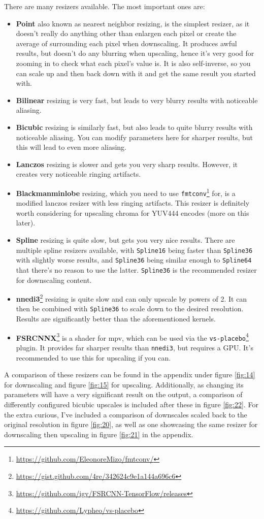 \documentclass{scrartcl}
\begin{document}
There are many resizers available.  The most important ones are:
\begin{itemize}
\item \textbf{Point} also known as nearest neighbor resizing, is the simplest resizer, as it doesn't really do anything other than enlargen each pixel or create the average of surrounding each pixel when downscaling.  It produces awful results, but doesn't do any blurring when upscaling, hence it's very good for zooming in to check what each pixel's value is.  It is also self-inverse, so you can scale up and then back down with it and get the same result you started with.
\item \textbf{Bilinear} resizing is very fast, but leads to very blurry results with noticeable aliasing.
\item \textbf{Bicubic} resizing is similarly fast, but also leads to quite blurry results with noticeable aliasing.  You can modify parameters here for sharper results, but this will lead to even more aliasing.
\item \textbf{Lanczos} resizing is slower and gets you very sharp results.  However, it creates very noticeable ringing artifacts.
\item \textbf{Blackmanminlobe} resizing, which you need to use \texttt{fmtconv}\footnote{\url{https://github.com/EleonoreMizo/fmtconv/}} for, is a modified lanczos resizer with less ringing artifacts.   This resizer is definitely worth considering for upscaling chroma for YUV444 encodes (more on this later).
\item \textbf{Spline} resizing is quite slow, but gets you very nice results.  There are multiple spline resizers available, with \texttt{Spline16} being faster than \texttt{Spline36} with slightly worse results, and \texttt{Spline36} being similar enough to \texttt{Spline64} that there's no reason to use the latter.  \texttt{Spline36} is the recommended resizer for downscaling content.
\item \textbf{nnedi3}\footnote{\url{https://gist.github.com/4re/342624c9e1a144a696c6}} resizing is quite slow and can only upscale by powers of 2.  It can then be combined with \texttt{Spline36} to scale down to the desired resolution.  Results are significantly better than the aforementioned kernels.
\item \textbf{FSRCNNX}\footnote{\url{https://github.com/igv/FSRCNN-TensorFlow/releases}} is a shader for mpv, which can be used via the \texttt{vs-placebo}\footnote{\url{https://github.com/Lypheo/vs-placebo}} plugin.  It provides far sharper results than \texttt{nnedi3}, but requires a GPU.  It's recommended to use this for upscaling if you can.
\end{itemize}
A comparison of these resizers can be found in the appendix under figure \ref{fig:14} for downscaling and figure \ref{fig:15} for upscaling.  Additionally, as changing its parameters will have a very significant result on the output, a comparison of differently configured bicubic upscales is included after these in figure \ref{fig:22}.  For the extra curious, I've included a comparison of downscales scaled back to the original resolution in figure \ref{fig:20}, as well as one showcasing the same resizer for downscaling then upscaling in figure \ref{fig:21} in the appendix.
\end{document}
